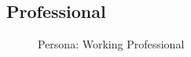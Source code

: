 \documentclass[a4paper,12pt]{report}
\begin{document}
\FloatBarrier
\subsection{Professional}
\begin{figure}[!htb]
	\caption{\label{fig:working_professional}Persona: Working Professional}	
\end{figure}

\FloatBarrier
\end{document}
